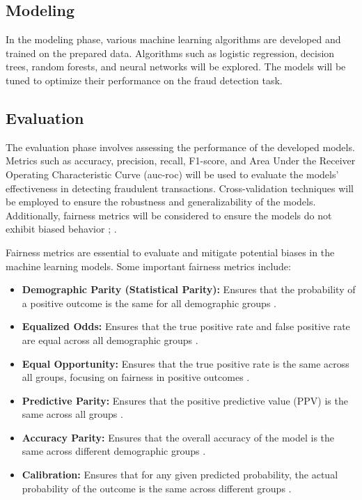 \documentclass[12pt,a4paper]{report}
\begin{document}
\subsection{Modeling}
In the modeling phase, various machine learning algorithms are developed and trained on the prepared data. Algorithms such as logistic regression, decision trees, random forests, and neural networks will be explored. The models will be tuned to optimize their performance on the fraud detection task.

\subsection{Evaluation}
The evaluation phase involves assessing the performance of the developed models. Metrics such as accuracy, precision, recall, F1-score, and Area Under the Receiver Operating Characteristic Curve (\acrshort{auc}-\acrshort{roc}) will be used to evaluate the models' effectiveness in detecting fraudulent transactions. Cross-validation techniques will be employed to ensure the robustness and generalizability of the models. Additionally, fairness metrics will be considered to ensure the models do not exhibit biased behavior \citep{barocas2023fairness}; \citep{mehrabi2021survey}.

Fairness metrics are essential to evaluate and mitigate potential biases in the machine learning models. Some important fairness metrics include:

\begin{itemize}
    \item \textbf{Demographic Parity (Statistical Parity):} Ensures that the probability of a positive outcome is the same for all demographic groups \citep{barocas2023fairness}.
    \item \textbf{Equalized Odds:} Ensures that the true positive rate and false positive rate are equal across all demographic groups \citep{barocas2023fairness}.
    \item \textbf{Equal Opportunity:} Ensures that the true positive rate is the same across all groups, focusing on fairness in positive outcomes \citep{barocas2023fairness}.
    \item \textbf{Predictive Parity:} Ensures that the positive predictive value (PPV) is the same across all groups \citep{barocas2023fairness}.
    \item \textbf{Accuracy Parity:} Ensures that the overall accuracy of the model is the same across different demographic groups \citep{barocas2023fairness}.
    \item \textbf{Calibration:} Ensures that for any given predicted probability, the actual probability of the outcome is the same across different groups \citep{mehrabi2021survey}.
\end{itemize}
\end{document}
